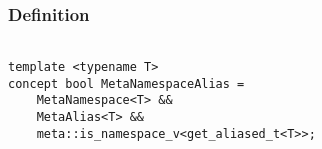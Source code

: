 
\subsubsection{Definition}

\begin{verbatim}

template <typename T>
concept bool MetaNamespaceAlias =
	MetaNamespace<T> &&
	MetaAlias<T> &&
	meta::is_namespace_v<get_aliased_t<T>>;

\end{verbatim}
